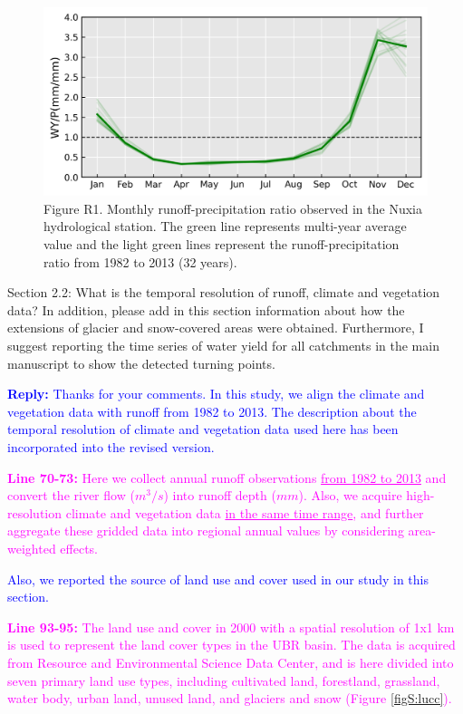 \documentclass[11pt]{article}
\newcounter{reviewer}
\newcounter{point}[reviewer]
\renewcommand{\thepoint}{Comment\,\thereviewer.\arabic{point}:}
\newcommand{\point}[1]{\refstepcounter{point} \bigskip \noindent {\fontseries{b}\selectfont \thepoint} #1 \par}
\newcommand{\reply}[1]{\bigskip \textcolor{blue}{\noindent \textbf {Reply:} #1}}
\newcommand{\nextreply}[1]{\bigskip \textcolor{blue}{\noindent #1}}
\newcommand{\revised}[3][2]{\bigskip \textcolor{magenta}{\noindent \textbf{Line #2:} #3}}
\begin{document}
\begin{figure}[ht]
    \centering
    \includegraphics[width=12cm]{02-figures/runoff-ratio.png}
    \captionsetup{labelformat=empty}
    \caption{Figure R1. Monthly runoff-precipitation ratio observed in the Nuxia hydrological station. The green line represents multi-year average value and the light green lines represent the runoff-precipitation ratio from 1982 to 2013 (32 years).}
\end{figure}

\point{Section 2.2: 
What is the temporal resolution of runoff, climate and vegetation data? 
In addition, please add in this section information about how the extensions of glacier and snow-covered areas were obtained.
Furthermore, I suggest reporting the time series of water yield for all catchments in the main manuscript to show the detected turning points.}
\reply{Thanks for your comments. In this study, we align the climate and vegetation data with runoff from 1982 to 2013. The description about the temporal resolution of climate and vegetation data used here has been incorporated into the revised version.}

\revised{70-73}{Here we collect annual runoff observations \ul{from 1982 to 2013} and convert the river flow ($m^{3}/s$) into runoff depth ($mm$). Also, we acquire high-resolution climate and vegetation data \ul{in the same time range}, and further aggregate these gridded data into regional annual values by considering area-weighted effects.}

\nextreply{Also, we reported the source of land use and cover used in our study in this section.}

\revised{93-95}{The land use and cover in 2000 with a spatial resolution of 1x1 km is used to represent the land cover types in the UBR basin. The data is acquired from Resource and Environmental Science Data Center, and is here divided into seven primary land use types, including cultivated land, forestland, grassland, water body, urban land, unused land, and glaciers and snow (Figure \ref{figS:lucc}).}
\end{document}
